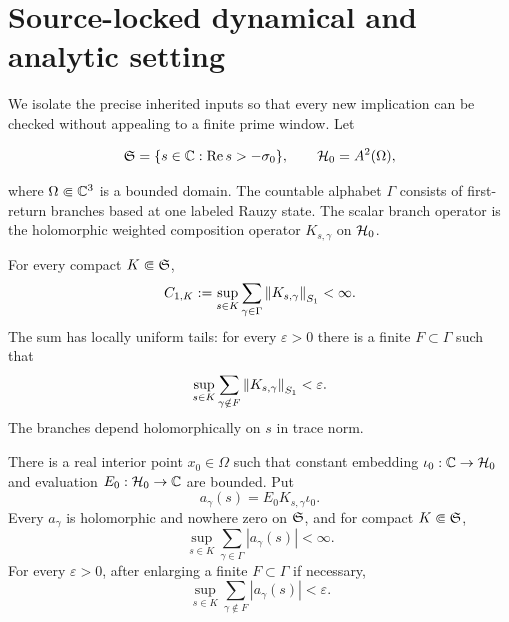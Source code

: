 \section{Source-locked dynamical and analytic setting}
\label{sec:setting}

We isolate the precise inherited inputs so that every new implication can be
checked without appealing to a finite prime window.  Let

\[
 \mathfrak S=\{s\in\mathbb C:\operatorname{Re}s>-\sigma_0\},
 \qquad \mathcal H_0=A^2(\Omega),
\]

where \(\Omega\Subset\mathbb C^3\) is a bounded domain.  The countable alphabet
\(\Gamma\) consists of first-return branches based at one labeled Rauzy
state.  The scalar branch operator is the holomorphic weighted composition
operator \(K_{s,\gamma}\) on \(\mathcal H_0\).

\begin{hypothesis}
\label{hyp:nuclear}
For every compact \(K\Subset\mathfrak S\),
\begin{equation}
 C_{1,K}:=
 \sup_{s\in K}\sum_{\gamma\in\Gamma}
 \left\lVert K_{s,\gamma}\right\rVert_{S_{1}}<\infty.
 \label{eq:nuclear-majorant}
\end{equation}
The sum has locally uniform tails: for every \(\varepsilon>0\) there is a
finite \(F\subset\Gamma\) such that
\begin{equation}
 \sup_{s\in K}\sum_{\gamma\notin F}
 \left\lVert K_{s,\gamma}\right\rVert_{S_{1}}<\varepsilon.
 \label{eq:nuclear-uniform-tail}
\end{equation}
The branches depend holomorphically on \(s\) in trace norm.
\end{hypothesis}

\begin{hypothesis}
\label{hyp:slice}
There is a real interior point \(x_0\in\Omega\) such that constant embedding
\(\iota_0:\mathbb C\to\mathcal H_0\) and evaluation \(E_0:\mathcal H_0\to\mathbb C\) are bounded.  Put
\begin{equation}
 a_\gamma(s)=E_0K_{s,\gamma}\iota_0.
 \label{eq:a-gamma}
\end{equation}
Every \(a_\gamma\) is holomorphic and nowhere zero on \(\mathfrak S\), and
for compact \(K\Subset\mathfrak S\),
\begin{equation}
 \sup_{s\in K}\sum_{\gamma\in\Gamma}|a_\gamma(s)|<\infty.
 \label{eq:a-l1}
\end{equation}
For every \(\varepsilon>0\), after enlarging a finite
\(F\subset\Gamma\) if necessary,
\begin{equation}
 \sup_{s\in K}\sum_{\gamma\notin F}|a_\gamma(s)|<\varepsilon.
 \label{eq:slice-uniform-tail}
\end{equation}
\end{hypothesis}

